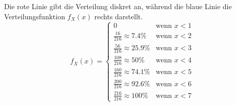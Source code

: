 \begin{uebsp}
\begin{Answer}
\begin{enumerate}[1.]
\begin{multicols}{2}
                \begin{tikzpicture}[scale=0.85]
                    
                \end{tikzpicture}

                Die rote Linie gibt die Verteilung diskret an, während die blaue Linie die Verteilungsfunktion $f_X(x)$ rechts darstellt.
            \columnbreak
            \[f_X(x) = \begin{cases} 
                        0 &\mbox{wenn } x < 1 \\
                        \frac{16}{216}\approx 7.4\% & \mbox{wenn } x < 2\\
                        \frac{56}{216}\approx 25.9\% & \mbox{wenn } x < 3\\
                        \frac{108}{216}\approx 50\% & \mbox{wenn } x < 4\\
                        \frac{160}{216}\approx 74.1\% & \mbox{wenn } x < 5\\
                        \frac{200}{216}\approx 92.6\% & \mbox{wenn } x < 6\\
                        \frac{216}{216}\approx 100\% & \mbox{wenn } x < 7 
                        \end{cases}\]
            \end{multicols}
    \end{enumerate}
\end{Answer}
\end{uebsp}

